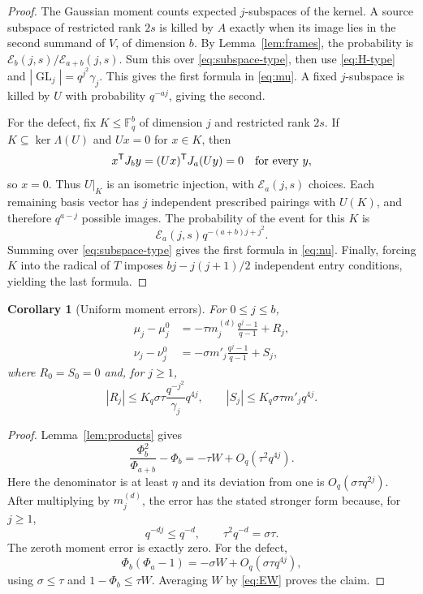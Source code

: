 \documentclass[11pt]{article}
\newtheorem{corollary}[theorem]{Corollary}
\theoremstyle{definition}
\theoremstyle{remark}
\newcommand{\F}{\mathbb F}
\newcommand{\GL}{\operatorname{GL}}
\newcommand{\Emb}{\mathcal E}
\newcommand{\tr}{\mathsf T}
\begin{document}
\begin{proof}
The Gaussian moment counts expected $j$-subspaces of the kernel. A source subspace of restricted rank $2s$ is killed by $A$ exactly when its image lies in the second summand of $V$, of dimension $b$. By Lemma~\ref{lem:frames}, the probability is $\Emb_b(j,s)/\Emb_{a+b}(j,s)$. Sum this over \eqref{eq:subspace-type}, then use \eqref{eq:H-type} and $|\GL_j|=q^{j^2}\gamma_j$. This gives the first formula in \eqref{eq:mu}. A fixed $j$-subspace is killed by $U$ with probability $q^{-aj}$, giving the second.

For the defect, fix $K\le\F_q^b$ of dimension $j$ and restricted rank $2s$. If $K\subseteq\ker\Lambda(U)$ and $Ux=0$ for $x\in K$, then
\[
 x^{\tr}J_by=(Ux)^{\tr}J_a(Uy)=0\quad\hbox{for every }y,
\]
so $x=0$. Thus $U|_K$ is an isometric injection, with $\Emb_a(j,s)$ choices. Each remaining basis vector has $j$ independent prescribed pairings with $U(K)$, and therefore $q^{a-j}$ possible images. The probability of the event for this $K$ is
\[
 \Emb_a(j,s)q^{-(a+b)j+j^2}.
\]
Summing over \eqref{eq:subspace-type} gives the first formula in \eqref{eq:nu}. Finally, forcing $K$ into the radical of $T$ imposes $bj-j(j+1)/2$ independent entry conditions, yielding the last formula.
\end{proof}

\begin{corollary}[Uniform moment errors]\label{cor:moment-errors}
For $0\le j\le b$,
\begin{align}
 \mu_j-\mu_j^0
 &=-\tau m_j^{(d)}\frac{q^j-1}{q-1}+R_j,\label{eq:rank-moment-error}\\
 \nu_j-\nu_j^0
 &=-\sigma m'_j\frac{q^j-1}{q-1}+S_j,\label{eq:defect-moment-error}
\end{align}
where $R_0=S_0=0$ and, for $j\ge1$,
\begin{equation}\label{eq:moment-remainders}
 |R_j|\le K_q\sigma\tau\frac{q^{-j^2}}{\gamma_j}q^{4j},\qquad
 |S_j|\le K_q\sigma\tau m'_jq^{4j}.
\end{equation}
\end{corollary}

\begin{proof}
Lemma~\ref{lem:products} gives
\[
 \frac{\Phi_b^2}{\Phi_{a+b}}-\Phi_b
 =-\tau W+O_q(\tau^2q^{4j}).
\]
Here the denominator is at least $\eta$ and its deviation from one is $O_q(\sigma\tau q^{2j})$. After multiplying by $m_j^{(d)}$, the error has the stated stronger form because, for $j\ge1$,
\[
 q^{-dj}\le q^{-d},\qquad \tau^2q^{-d}=\sigma\tau.
\]
The zeroth moment error is exactly zero. For the defect,
\[
 \Phi_b(\Phi_a-1)=-\sigma W+O_q(\sigma\tau q^{4j}),
\]
using $\sigma\le\tau$ and $1-\Phi_b\le\tau W$. Averaging $W$ by \eqref{eq:EW} proves the claim.
\end{proof}
\end{document}
